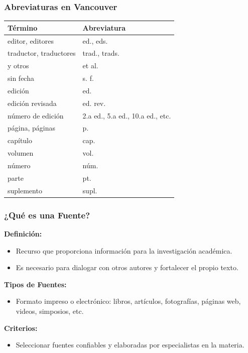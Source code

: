 \documentclass[
11pt, %
]{beamer}
\begin{document}
\begin{frame}
	\frametitle{Abreviaturas en Vancouver}

	\begin{tabular}{ll}
		\textbf{Término}       & \textbf{Abreviatura}             \\
		\midrule
		editor, editores       & ed., eds.                        \\
		traductor, traductores & trad., trads.                    \\
		y otros                & et al.                           \\
		sin fecha              & s. f.                            \\
		edición                & ed.                              \\
		edición revisada       & ed. rev.                         \\
		número de edición      & 2.a ed., 5.a ed., 10.a ed., etc. \\
		página, páginas        & p.                               \\
		capítulo               & cap.                             \\
		volumen                & vol.                             \\
		número                 & núm.                             \\
		parte                  & pt.                              \\
		suplemento             & supl.                            \\
	\end{tabular}

\end{frame}

\begin{frame}
	\frametitle{¿Qué es una Fuente?}

	\textbf{Definición:}
	\begin{itemize}
		\item Recurso que proporciona información para la investigación académica.
		\item Es necesario para dialogar con otros autores y fortalecer el propio texto.
	\end{itemize}

	\textbf{Tipos de Fuentes:}
	\begin{itemize}
		\item Formato impreso o electrónico: libros, artículos, fotografías, páginas web, videos, simposios, etc.
	\end{itemize}

	\textbf{Criterios:}
	\begin{itemize}
		\item Seleccionar fuentes confiables y elaboradas por especialistas en la materia.
	\end{itemize}

\end{frame}
\end{document}
